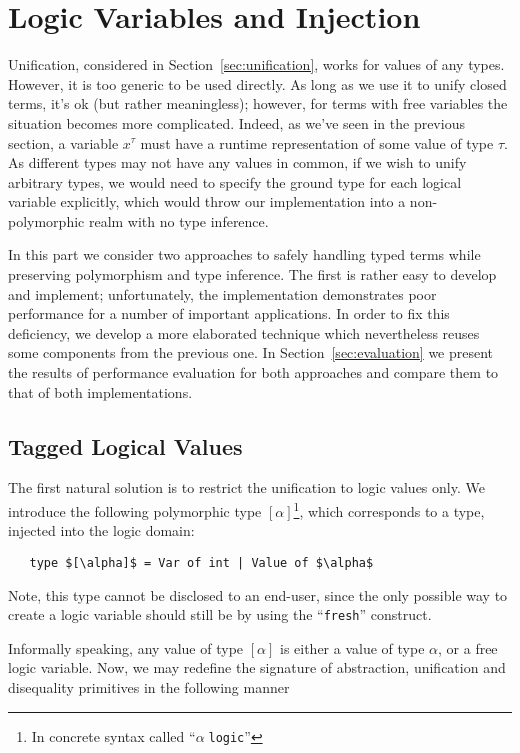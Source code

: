 \section{Logic Variables and Injection}
\label{sec:injection}

Unification, considered in Section~\ref{sec:unification}, works for values of any types. However, it
is too generic to be used directly. As long as we use it to unify closed terms, it's ok (but rather meaningless);
however, for terms with free variables the situation becomes more complicated. Indeed, as we've seen in the
previous section, a variable $x^\tau$ must have a runtime representation of some value of type $\tau$. As different
types may not have any values in common, if we wish to unify arbitrary types, we would need to specify the
ground type for each logical variable explicitly, which would throw our implementation into a non-polymorphic
realm with no type inference.

In this part we consider two approaches to safely handling typed terms while preserving polymorphism and
type inference. The first is rather easy to develop and implement; unfortunately, the implementation demonstrates
poor performance for a number of important applications. In order to fix this deficiency, we develop a more
elaborated technique which nevertheless reuses some components from the previous one. In Section~\ref{sec:evaluation}
we present the results of performance evaluation for both approaches and compare them to that of both
implementations.

\subsection{Tagged Logical Values}

The first natural solution is to restrict the unification to logic values only. We introduce the following polymorphic
type $[\alpha]$\footnote{In concrete syntax called ``$\alpha\;$\lstinline{logic}''}, which corresponds to a type, injected into
the logic domain:

\begin{lstlisting}
   type $[\alpha]$ = Var of int | Value of $\alpha$
\end{lstlisting}

Note, this type cannot be disclosed to an end-user, since the only possible way to create a logic variable should
still be by using the ``\lstinline{fresh}'' construct.

Informally speaking, any value of type $[\alpha]$ is either a value of type $\alpha$, or a free
logic variable. Now, we may redefine the signature of abstraction, unification and disequality primitives in the
following manner

